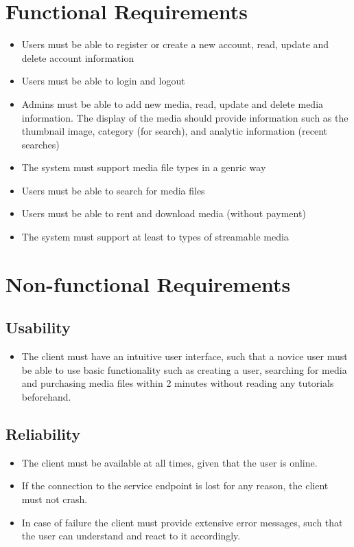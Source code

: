 \documentclass{report}
\begin{document}
\section{Functional Requirements}

\begin{itemize}
\item Users must be able to register or create a new account, read, update and delete  account information
\item Users must be able to login and logout
\item Admins must be able to add new media, read, update and delete media information. The display of the media should provide information such as the thumbnail image, category (for search), and analytic information (recent searches)
\item The system must support media file types in a genric way
\item Users must be able to search for media files
\item Users must be able to rent and download media (without payment)
\item The system must support at least to types of streamable media
\end{itemize}

\section{Non-functional Requirements}

\subsection{Usability}

\begin{itemize}
\item The client must have an intuitive user interface, such that a novice user must be able to use basic functionality such as creating a user, searching for media and purchasing media files within 2 minutes without reading any tutorials beforehand.
\end{itemize}

\subsection{Reliability}

\begin{itemize}
\item The client must be available at all times, given that the user is online. 
\item If the connection to the service endpoint is lost for any reason, the client must not crash. \item In case of failure the client must provide extensive error messages, such that the user can understand and react to it accordingly.
\end{itemize}
\end{document}
